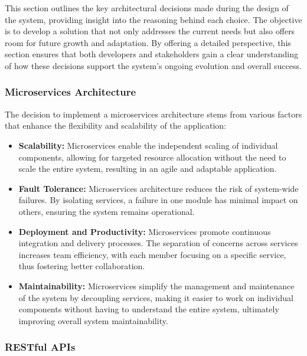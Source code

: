 This section outlines the key architectural decisions made during the design of the system, providing insight into the reasoning behind each choice. The objective is to develop a solution that not only addresses the current needs but also offers room for future growth and adaptation. By offering a detailed perspective, this section ensures that both developers and stakeholders gain a clear understanding of how these decisions support the system’s ongoing evolution and overall success.

\subsubsection{Microservices Architecture}

The decision to implement a microservices architecture stems from various factors that enhance the flexibility and scalability of the application:

\begin{itemize}
    \item \textbf{Scalability:} Microservices enable the independent scaling of individual components, allowing for targeted resource allocation without the need to scale the entire system, resulting in an agile and adaptable application.
    \item \textbf{Fault Tolerance:} Microservices architecture reduces the risk of system-wide failures. By isolating services, a failure in one module has minimal impact on others, ensuring the system remains operational.
    \item \textbf{Deployment and Productivity:} Microservices promote continuous integration and delivery processes. The separation of concerns across services increases team efficiency, with each member focusing on a specific service, thus fostering better collaboration.
    \item \textbf{Maintainability:} Microservices simplify the management and maintenance of the system by decoupling services, making it easier to work on individual components without having to understand the entire system, ultimately improving overall system maintainability.
\end{itemize}

\subsubsection{RESTful APIs}

